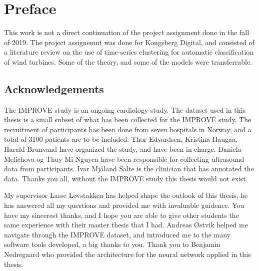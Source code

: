 \chapter*{Preface}
%

This work is not a direct continuation of the project assignment done in the fall of 2019. The project assignemnt was done for Kongsberg Digital, and consisted of a literature review on the use of time-series clustering for automatic classification of wind turbines. Some of the theory, and some of the models were transferrable. 

\section*{Acknowledgements}

The IMPROVE study is an ongoing cardiology study. The dataset used in this thesis is a small subset of what has been collected for the IMPROVE study. The recruitment of participants has been done from seven hospitals in Norway, and a total of 3100 patients are to be included. Thor Edvardsen, Kristina Haugaa, Harald Brunvand have organized the study, and have been in charge. Daniela Melichova og Thuy Mi Nguyen have been responsible for collecting ultrasound data from participants. Ivar Mjåland Salte is the clinician that has annotated the data. Thanks you all, without the IMPROVE study this thesis would not exist. \bigskip

My supervisor Lasse Løvstakken has helped shape the outlook of this thesis, he has answered all my questions and provided me with invaluable guidence. You have my sincerest thanks, and I hope you are able to give other students the same experience with their master thesis that I had. Andreas Østvik helped me navigate through the IMPROVE dataset, and introduced me to the many software tools developed, a big thanks to you. Thank you to Benjamin Nedregaard who provided the architecture for the neural network applied in this thesis.

